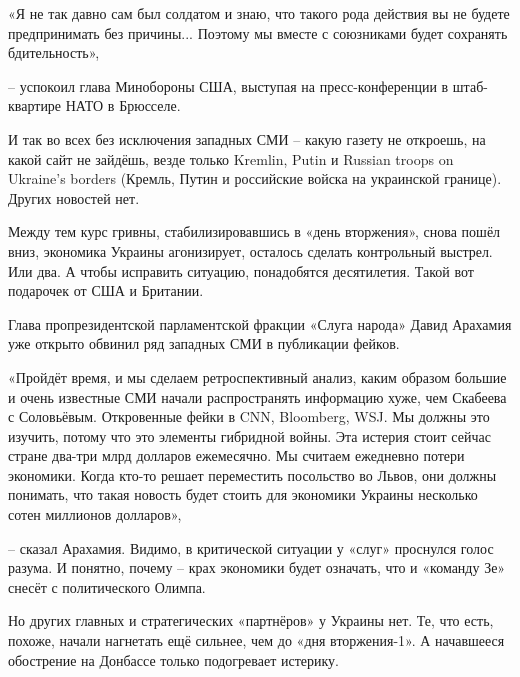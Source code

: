 \begin{zznagolos}
«Я не так давно сам был солдатом и знаю, что такого рода действия вы не будете
предпринимать без причины... Поэтому мы вместе с союзниками будет сохранять
бдительность»,	
\end{zznagolos}

– успокоил глава Минобороны США, выступая на пресс-конференции в штаб-квартире
НАТО в  Брюсселе.


И так во всех без исключения западных СМИ – какую газету не откроешь, на какой
сайт не зайдёшь, везде только Kremlin, Putin и Russian troops on Ukraine's
borders (Кремль, Путин и российские войска на украинской границе). Других
новостей нет.

Между тем курс гривны, стабилизировавшись в «день вторжения», снова пошёл вниз,
экономика Украины агонизирует, осталось сделать контрольный выстрел. Или два. А
чтобы исправить ситуацию, понадобятся десятилетия. Такой вот подарочек от США и
Британии.

Глава пропрезидентской парламентской фракции «Слуга народа» Давид Арахамия уже
открыто обвинил ряд западных СМИ в публикации фейков.

\begin{zznagolos}
«Пройдёт время, и мы сделаем ретроспективный анализ, каким образом большие и
очень известные СМИ начали распространять информацию хуже, чем Скабеева с
Соловьёвым. Откровенные фейки в CNN, Bloomberg, WSJ. Мы должны это изучить,
потому что это элементы гибридной войны. Эта истерия стоит сейчас стране
два-три млрд долларов ежемесячно. Мы считаем ежедневно потери экономики. Когда
кто-то решает переместить посольство во Львов, они должны понимать, что такая
новость будет стоить для экономики Украины несколько сотен миллионов долларов»,	
\end{zznagolos}

– сказал Арахамия. Видимо, в критической ситуации у «слуг» проснулся голос
разума. И понятно, почему – крах экономики будет означать, что и «команду Зе»
снесёт с политического Олимпа.

Но других главных и стратегических «партнёров» у Украины нет. Те, что есть,
похоже, начали нагнетать ещё сильнее, чем до «дня вторжения-1». А начавшееся
обострение на Донбассе только подогревает истерику.
